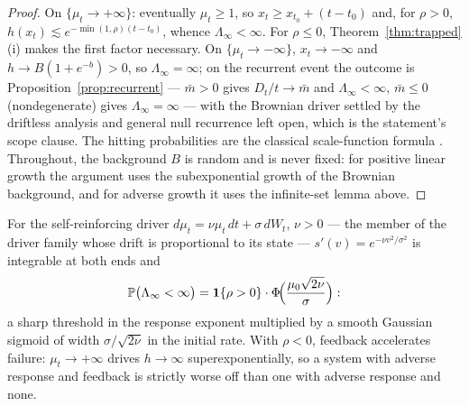 
\begin{proof}
On $\{\mu_t\to+\infty\}$: eventually $\mu_t\ge1$, so
$x_t\ge x_{t_0}+(t-t_0)$ and, for $\rho>0$,
$h(x_t)\lesssim e^{-\min(1,\rho)(t-t_0)}$, whence
$\Lambda_\infty<\infty$. For $\rho\le0$,
Theorem~\ref{thm:trapped}(i) makes the first factor necessary. On
$\{\mu_t\to-\infty\}$, $x_t\to-\infty$ and
$h\to B(1+e^{-b})>0$, so $\Lambda_\infty=\infty$; on the recurrent
event the outcome is Proposition~\ref{prop:recurrent} ---
$\bar m>0$ gives $D_t/t\to\bar m$ and $\Lambda_\infty<\infty$,
$\bar m\le0$ (nondegenerate) gives $\Lambda_\infty=\infty$ --- with
the Brownian driver settled by the driftless analysis and general
null recurrence left open, which is the statement's scope clause.
The hitting probabilities are the classical scale-function formula
\cite{KT81,RY99}.
 Throughout, the background $B$ is random and is never fixed: for positive linear growth the argument uses the subexponential growth of the Brownian background, and for adverse growth it uses the infinite-set lemma above. \end{proof}

\begin{corollary}\label{cor:solvable}
For the self-reinforcing driver $d\mu_t=\nu\mu_t\,dt+\sigma\,dW_t$,
$\nu>0$ --- the member of the driver family whose drift is
proportional to its state ---
$s'(v)=e^{-\nu v^2/\sigma^2}$ is integrable at both ends and
\begin{equation}\label{eq:sigmoid}
\mathbb{P}\bigl(\Lambda_\infty<\infty\bigr)
=\mathbf{1}\{\rho>0\}\cdot\Phi\!\Bigl(\frac{\mu_0\sqrt{2\nu}}{\sigma}\Bigr):
\end{equation}
a sharp threshold in the response exponent multiplied by a smooth
Gaussian sigmoid of width $\sigma/\sqrt{2\nu}$ in the initial rate.
With $\rho<0$, feedback accelerates failure:
$\mu_t\to+\infty$ drives $h\to\infty$ superexponentially, so a system
with adverse response and feedback is strictly worse off than one with
adverse response and none.
\end{corollary}

